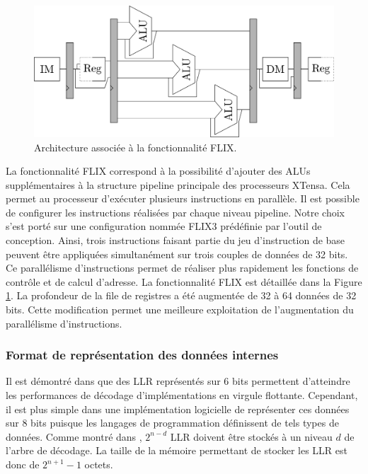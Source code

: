 \begin{figure}
\centering
\includegraphics[width=\textwidth]{main/ch3_fig/flix}
\caption{Architecture associée à la fonctionnalité FLIX.}
\label{fig:flix}
\end{figure}

La fonctionnalité FLIX correspond à la possibilité d'ajouter des ALUs supplémentaires à la structure pipeline principale des processeurs XTensa. Cela permet au processeur d'exécuter plusieurs instructions en parallèle. Il est possible de configurer les instructions réalisées par chaque niveau pipeline. Notre choix s'est porté sur une configuration nommée FLIX3 prédéfinie par l'outil de conception. Ainsi, trois instructions faisant partie du jeu d'instruction de base peuvent être appliquées simultanément sur trois couples de données de 32 bits. Ce parallélisme d'instructions permet de réaliser plus rapidement les fonctions de contrôle et de calcul d'adresse. La fonctionnalité FLIX est détaillée dans la Figure \ref{fig:flix}.
La profondeur de la file de registres a été augmentée de 32 à 64 données de 32 bits. Cette modification permet une meilleure exploitation de l'augmentation du parallélisme d'instructions.

\subsubsection{Format de représentation des données internes}
Il est démontré dans \cite{sarkis_fast_2014} que des LLR représentés sur 6 bits permettent d'atteindre les performances de décodage d'implémentations en virgule flottante. Cependant, il est plus simple dans une implémentation logicielle de représenter ces données sur 8 bits puisque les langages de programmation définissent de tels types de données. Comme montré dans \cite{leroux_hardware_2011}, $2^{n-d}$ LLR doivent être stockés à un niveau $d$ de l'arbre de décodage. La taille de la mémoire permettant de stocker les LLR est donc de $2^{n+1}-1$ octets.


